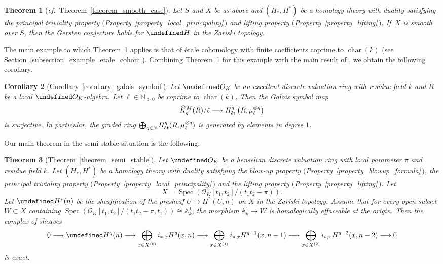 \documentclass[10pt,a4paper]{article}
\let\cal\undefined
\numberwithin{equation}{section}
\newtheorem{theorem}{Theorem}[section]
\newtheorem{Key lemma}[theorem]{Key lemma}
\newtheorem{corollary}[theorem]{Corollary}
\theoremstyle{definition}
\theoremstyle{remark}
\newcommand{\bb}{\mathbb}
\newcommand{\roi}{\mathcal{O}}
\newcommand{\sub}[1]{{\mbox{\rm \scriptsize #1}}}
\newcommand{\To}{\longrightarrow}
\newcommand{\cal}{\mathcal}
\renewcommand{\hat}{\widehat}
\DeclareMathOperator{\Char}{char}
\DeclareMathOperator{\Spec}{Spec}
\begin{document}
\begin{theorem}[\textit{cf.}~Theorem~\ref{theorem_smooth_case}]\label{theorem_intro}
  Let $S$ and $X$ be as above and $(H_*,H^*)$ be a homology theory with duality satisfying the principal triviality property $($Property~\ref{property_local_principality}\,$)$ and lifting property $($Property~\ref{property_lifting}\,$)$. 
 If\, $X$ is smooth over $S$, then the Gersten conjecture holds for $\cal H$ in the Zariski topology.
\end{theorem}

The main example to which Theorem~\ref{theorem_intro} applies is that of \'etale cohomology with finite coefficients coprime to $\Char(k)$ (see Section~\ref{subsection_example_etale_cohom}). 
Combining Theorem~\ref{theorem_intro} for this example with the main result of \cite{Lu20}, we obtain the following corollary.

\begin{corollary}[Corollary~\ref{corollary_galois_symbol}]
Let $\cal O_K$ be an excellent discrete valuation ring with residue field $k$ and $R$ be a local $\cal O_K$-algebra. Let $\ell\in \bb N_{>0}$ be coprime to $\Char(k)$. Then the Galois symbol map
$$
\hat{K}^M_q(R)/\ell\longrightarrow H^q_\sub{\'et}\left(R,\mu_\ell^{\otimes q}\right)
$$
is surjective. In particular, the graded ring $\bigoplus_{q\in \bb N}H^q_\sub{\'et}(R,\mu_\ell^{\otimes q} )$ is generated by elements in degree $1$.
\end{corollary}

Our main theorem in the semi-stable situation is the following.

\begin{theorem}[Theorem~\ref{theorem_semi_stable}]\label{theorem_semi_stable_intro}
Let $\cal O_K$ be a henselian discrete valuation ring with local parameter $\pi$ and residue field $k$. Let $(H_*,H^*)$ be a homology theory with duality satisfying the blow-up property $($Property~\ref{property_blowup_formula}\,$)$, the principal triviality property $($Property~\ref{property_local_principality}\,$)$ and the lifting property $($Property~\ref{property_lifting}\,$)$. 
Let 
$$
X=\Spec(\roi_K[t_1,t_2]/(t_1^{} t_{2}^{}-\pi)).
$$
Let $\cal H^*(n)$ be the sheafification of the presheaf $U\mapsto H^*(U,n)$ on $X$ in the Zariski topology. Assume that for every open subset $W\subset X$ containing $\Spec(\roi_K[t_1,t_2]/(t_1^{}t_{2}^{}-\pi,t_1))\cong \bb A^1_k$, the morphism $ \bb A^1_k\to W$ is homologically effaceable at the origin. Then the complex of sheaves
\begin{equation*}
0\To \cal H^q(n) \To \bigoplus_{x\in X^{(0)}}i_{*,x}H^{q}(x,n)\To \bigoplus_{x\in X^{(1)}}i_{*,x}H^{q-1}(x,n-1)\To \bigoplus_{x\in X^{(2)}}i_{*,x}H^{q-2}(x,n-2)\To 0 
\end{equation*}
is exact.
\end{theorem}
\end{document}
